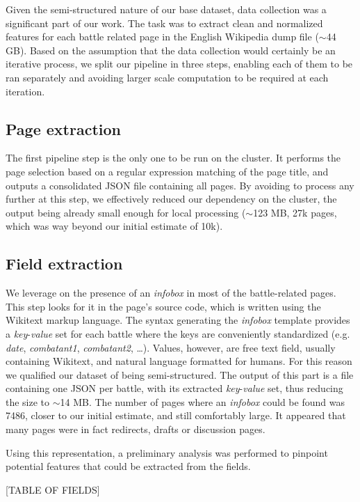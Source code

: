 Given the semi-structured nature of our base dataset, data collection was a significant part of our work. The task was to extract clean and normalized features for each battle related page in the English Wikipedia dump file ($\sim $44 GB). Based on the assumption that the data collection would certainly be an iterative process, we split our pipeline in three steps, enabling each of them to be ran separately and avoiding larger scale computation to be required at each iteration.

\subsection{Page extraction}
The first pipeline step is the only one to be run on the cluster. It performs the page selection based on a regular expression matching of the page title, and outputs a consolidated JSON file containing all pages. By avoiding to process any further at this step, we effectively reduced our dependency on the cluster, the output being already small enough for local processing ($\sim $123 MB, 27k pages, which was way beyond our initial estimate of 10k).

\subsection{Field extraction}
We leverage on the presence of an \textit{infobox} in most of the battle-related pages. This step looks for it in the page's source code, which is written using the Wikitext\cite{wikitext} markup language. The syntax generating the \textit{infobox} template\cite{template} provides a \textit{key}-\textit{value} set for each battle where the keys are conveniently standardized (e.g. \textit{date}, \textit{combatant1}, \textit{combatant2}, \dots).   Values, however, are free text field, usually containing Wikitext, and natural language formatted for humans. For this reason we qualified our dataset of being semi-structured. The output of this part is a file containing one JSON per battle, with its extracted \textit{key}-\textit{value} set, thus reducing the size to $\sim $14 MB. The number of pages where an \textit{infobox} could be found was 7486, closer to our initial estimate, and still comfortably large. It appeared that many pages were in fact redirects, drafts or discussion pages.  

Using this representation, a preliminary analysis was performed to pinpoint potential features that could be extracted from the fields.

[TABLE OF FIELDS]